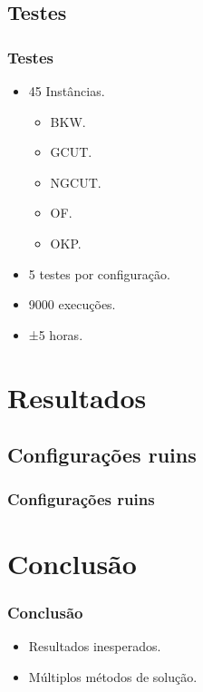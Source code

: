 \documentclass[12pt]{beamer}
\begin{document}
    \subsection{Testes}\label{subsec:testes}
    \begin{frame}
        \frametitle{Testes}
        \begin{itemize}
            \item 45 Instâncias.
            \begin{itemize}
                \item BKW.
                \item GCUT.
                \item NGCUT.
                \item OF.
                \item OKP.
            \end{itemize}
            \item 5 testes por configuração.
            \item 9000 execuções.
            \item ±5 horas.
        \end{itemize}
    \end{frame}


    \section{Resultados}\label{sec:resultados}

    \subsection{Configurações ruins}\label{subsec:configuracoes-ruins}
    \begin{frame}
        \frametitle{Configurações ruins}

    \end{frame}


    \section{Conclusão}\label{sec:conclusao}
    \begin{frame}
        \frametitle{Conclusão}
        \begin{itemize}
            \item Resultados inesperados.
            \item Múltiplos métodos de solução.
        \end{itemize}
    \end{frame}
\end{document}
